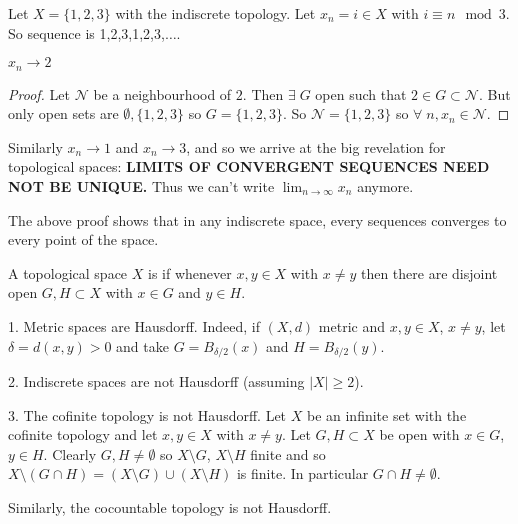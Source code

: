 \begin{example}
    Let $X = \{1,2,3\}$ with the indiscrete topology. Let $x_n =i\in X$ with $i\equiv n \mod 3$. So sequence is 1,2,3,1,2,3,$\dots$.

    \begin{claim}
        $x_n \to 2$
    \end{claim} 

    \begin{proof}
    Let $\mathcal{N}$ be a neighbourhood of $2$. Then $\exists \; G$ open such that $2 \in G \subset \mathcal{N}$.
    But only open sets are $\emptyset, \{1,2,3\}$ so $G = \{1,2,3\}$. So $\mathcal{N} = \{1,2,3\}$ so $\forall \; n, x_n \in \mathcal{N}$. 
    \end{proof}
    Similarly $x_n \to 1$ and $x_n \to 3$, and so we arrive at the big revelation for topological spaces: \textbf{\color{red} LIMITS OF CONVERGENT SEQUENCES NEED NOT BE UNIQUE.}
    Thus we can't write $\lim_{n \to \infty} x_n$ anymore.
\end{example} 

\begin{remark}
The above proof shows that in any indiscrete space, every sequences converges to every point of the space.
\end{remark}

\begin{definition}[Hausdorff]
A topological space $X$ is  if whenever $x,y \in X$ with $x \neq y$ then there are disjoint open $G,H \subset X$ with $x \in G$ and $y \in H$.
\end{definition}

\begin{example}
1. Metric spaces are Hausdorff. Indeed, if $(X,d)$ metric and $x,y \in X$, $x \neq y$, let $\delta = d(x,y) >0$ and take $G = B_{\delta/2}(x)$ and $H=B_{\delta/2}(y)$.

2. Indiscrete spaces are not Hausdorff (assuming $|X| \geq 2$).

3. The cofinite topology is not Hausdorff.
Let $X$ be an infinite set with the cofinite topology and let $x,y\in X$ with $x\neq y$.
Let $G,H\subset X$ be open with $x\in G$, $y\in H$.
Clearly $G,H\neq \emptyset$ so $X \setminus G$, $X \setminus H$ finite and so $X \setminus (G\cap H) = (X \setminus G)\cup (X \setminus H)$ is finite.
In particular $G\cap H \neq \emptyset$.

Similarly, the cocountable topology is not Hausdorff.
\end{example}

